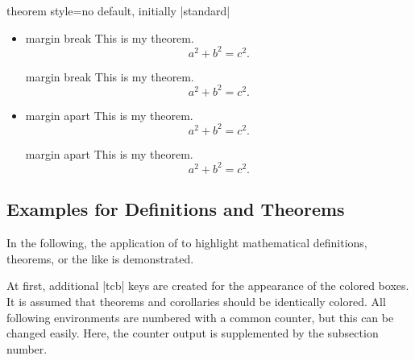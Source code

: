 \begin{docTcbKey}{theorem style}{=}{no default, initially |standard|}
\begin{itemize}
\begin{dispExample}
\begin{theorem}[theorem style=margin,left=10mm,oversize]{margin}{}
This is my theorem. \begin{equation*} a^2 + b^2 = c^2. \end{equation*}
\end{theorem}
\end{dispExample}
%
\item{}
\begin{dispExample}
\begin{theorem}[theorem style=margin break,left=10mm]{margin break}{}
This is my theorem. \begin{equation*} a^2 + b^2 = c^2. \end{equation*}
\end{theorem}
\begin{theorem}[theorem style=margin break,left=10mm,oversize]{margin break}{}
This is my theorem. \begin{equation*} a^2 + b^2 = c^2. \end{equation*}
\end{theorem}
\end{dispExample}
%
\item{}
\begin{dispExample}
\begin{theorem}[theorem style=margin apart,left=10mm]{margin apart}{}
This is my theorem. \begin{equation*} a^2 + b^2 = c^2. \end{equation*}
\end{theorem}
\begin{theorem}[theorem style=margin apart,left=10mm,oversize]{margin apart}{}
This is my theorem. \begin{equation*} a^2 + b^2 = c^2. \end{equation*}
\end{theorem}
\end{dispExample}
%
\end{itemize}
\end{docTcbKey}


%
\clearpage
\subsection{Examples for Definitions and Theorems}
In the following, the application of 
to highlight mathematical definitions, theorems, or the like is demonstrated.

At first, additional |tcb| keys are created for the appearance of
the colored boxes. It is assumed that theorems and corollaries should be
identically colored.
All following environments are numbered with a common counter, but this
can be changed easily. Here, the counter output is supplemented by
the subsection number.

